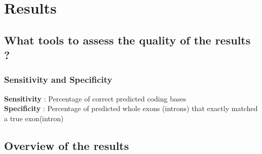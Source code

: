 \documentclass{beamer}
\begin{document}
\section{Results}

\subsection{What tools to assess the quality of the results ?}

\begin{frame}
\frametitle{Sensitivity and Specificity}

	\textbf{Sensitivity} : Percentage of correct predicted coding bases\\
	\vspace{1 cm}
	\textbf{Specificity} : Percentage of predicted whole exons (introns) that exactly matched a true exon(intron)

\end{frame}

\subsection{Overview of the results}
\end{document}
